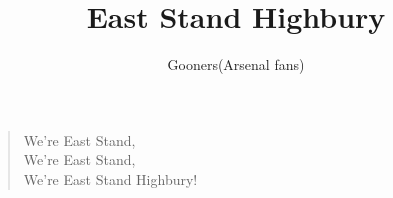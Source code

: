 \documentclass[a4paper,12pt]{article}
\title{East Stand Highbury}
\author{Gooners(Arsenal fans)}
\date{}
\begin{document}
	
	\maketitle
	
	\begin{verse}
		
		We're East Stand, \\
		We're East Stand, \\
		We're East Stand Highbury!
		
	\end{verse}
	
\end{document}
